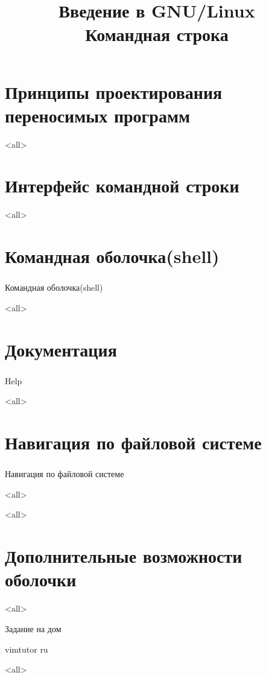 
\title{Введение в GNU/Linux\\Командная строка}


\begin{frame}
 \frametitle{}
 \titlepage
\end{frame}

\section{Принципы проектирования переносимых программ}
\mode<all>{}

\section{Интерфейс командной строки}
\mode<all>{}

\section{ Командная оболочка(shell) }
\begin{frame}
\frametitle{}
 \begin{center}
   {\Large Командная оболочка(shell) }
 \end{center}
\end{frame}

\mode<all>{}

\section{ Документация }
\begin{frame}
\frametitle{}
 \begin{center}
   {\Large Help }
 \end{center}
\end{frame}
\mode<all>{}

\section{ Навигация по файловой системе}
\begin{frame}
\frametitle{}
 \begin{center}
   {\Large Навигация по файловой системе }
 \end{center}
\end{frame}
\mode<all>{}

\mode<all>{}


\section{ Дополнительные возможности оболочки}
\mode<all>{}


\begin{frame}{Задание на дом}
\begin{block}{}
vimtutor ru
\end{block}
\end{frame}

\mode<all>

